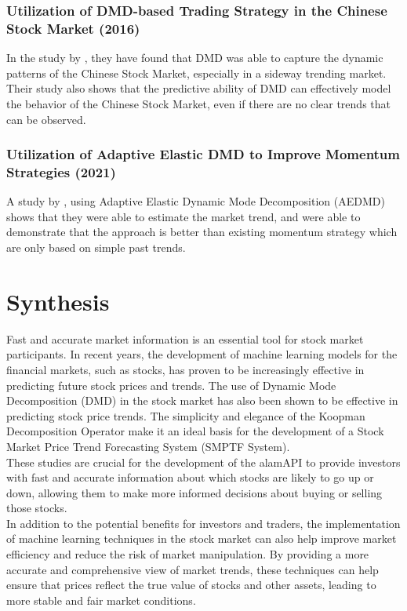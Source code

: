 \subsubsection{Utilization of DMD-based Trading Strategy in the Chinese Stock Market (2016)}
\label{subsubsec:dmd_chinese_stock_market}
In the study by , they have found that DMD was able to capture the 
dynamic patterns of the Chinese Stock Market, especially in a sideway trending market.
\\Their study also shows that the predictive ability of DMD can effectively 
model the behavior of the Chinese Stock Market, even if there are no 
clear trends that can be observed.
\subsubsection{Utilization of Adaptive Elastic DMD to Improve Momentum Strategies (2021)}
\label{subsubsec:dmd_adaptive_elastic}
A study by , using Adaptive Elastic Dynamic Mode Decomposition 
(AEDMD) shows that they were able to estimate the market trend, and were able to 
demonstrate that the approach is better than existing momentum strategy which 
are only based on simple past trends.

\section{Synthesis}
\label{sec:synthesis}
Fast and accurate market information is an essential tool 
for stock market participants. In recent years, the development 
of machine learning models for the financial markets, such as stocks, 
has proven to be increasingly effective in predicting future stock prices and trends. 
The use of Dynamic Mode Decomposition (DMD) in the stock market has also been shown 
to be effective in predicting stock price trends. The simplicity and elegance of 
the Koopman Decomposition Operator make it an ideal basis for the development of 
a Stock Market Price Trend Forecasting System (SMPTF System).
\\These studies are crucial for the development of the alamAPI to 
provide investors with fast and accurate information about which stocks are 
likely to go up or down, allowing them to make more informed decisions about 
buying or selling those stocks.
\\In addition to the potential benefits for investors and traders, the 
implementation of machine learning techniques in the stock market can also 
help improve market efficiency and reduce the risk of market manipulation. 
By providing a more accurate and comprehensive view of market trends, 
these techniques can help ensure that prices reflect the true value of 
stocks and other assets, leading to more stable and fair market conditions.